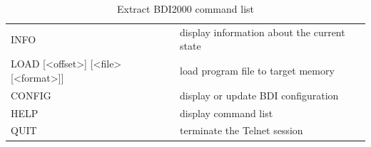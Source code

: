 \begin{table}[H]
\begin{tabular}{ll}
INFO &display information about the current state\\
LOAD [<offset>]  [<file> [<format>]] & load program file to target memory\\
CONFIG &display or update BDI configuration\\
HELP &display command list\\
QUIT &terminate the Telnet session\\

\end{tabular}
\caption[Extract BDI2000 command list]{Extract BDI2000 command list\cite{BDIUSERMAN}}
\label{tab:BDIComands}
\end{table}

